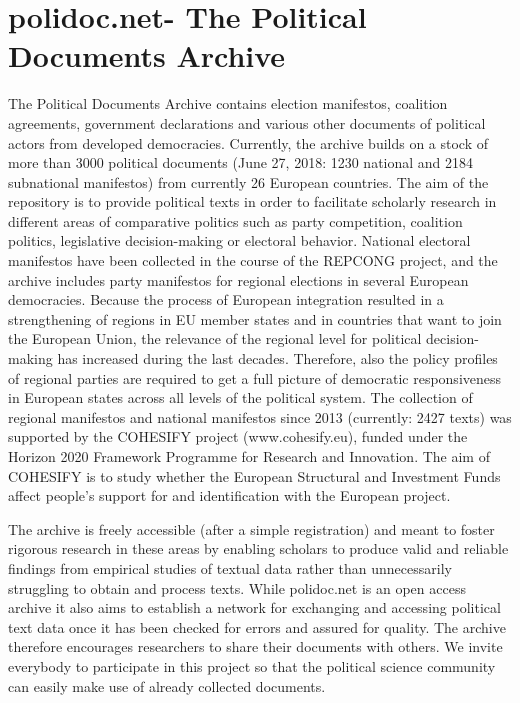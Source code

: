 \documentclass[a4paper, 12pt]{article}
\begin{document}
\section{polidoc.net- The Political Documents Archive}
The Political Documents Archive contains election manifestos, coalition agreements, government declarations and various other documents of political actors from developed democracies. Currently, the archive builds on a stock of more than 3000 political documents (June 27, 2018: 1230 national and 2184 subnational manifestos) from currently 26 European countries. The aim of the repository is to provide political texts in order to facilitate scholarly research in different areas of comparative politics such as party competition, coalition politics, legislative decision-making or electoral behavior. National electoral manifestos have been collected in the course of the REPCONG project, and the archive includes party manifestos for regional elections in several European democracies. Because the process of European integration resulted in a strengthening of regions in EU member states and in countries that want to join the European Union, the relevance of the regional level for political decision-making has increased during the last decades. Therefore, also the policy profiles of regional parties are required to get a full picture of democratic responsiveness in European states across all levels of the political system. The collection of regional manifestos and national manifestos since 2013 (currently: 2427 texts) was supported by the COHESIFY project (www.cohesify.eu), funded under the Horizon 2020 Framework Programme for Research and Innovation. The aim of COHESIFY is to study whether the European Structural and Investment Funds affect people’s support for and identification with the European project.

The archive is freely accessible (after a simple registration) and meant to foster rigorous research in these areas by enabling scholars to produce valid and reliable findings from empirical studies of textual data rather than unnecessarily struggling to obtain and process texts. While polidoc.net is an open access archive it also aims to establish a network for exchanging and accessing political text data once it has been checked for errors and assured for quality. The archive therefore encourages researchers to share their documents with others. We invite everybody to participate in this project so that the political science community can easily make use of already collected documents.
\end{document}
